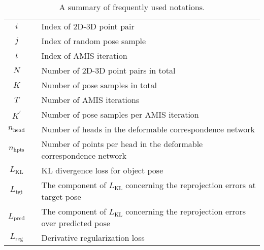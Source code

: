 \documentclass[10pt,twocolumn,letterpaper]{article}
\begin{document}
\begin{table*}[b]
\begin{center}
{\begin{tabular}{cll}
        $i$ & & Index of 2D-3D point pair\\
        $j$ & & Index of random pose sample\\
        $t$ & & Index of AMIS iteration\\
        $N$ & & Number of 2D-3D point pairs in total\\
        $K$ & & Number of pose samples in total\\
        $T$ & & Number of AMIS iterations\\
        $K^\prime$ & & Number of pose samples per AMIS iteration\\
        $n_\text{head}$ & & Number of heads in the deformable correspondence network\\
        $n_\text{hpts}$ & & Number of points per head in the deformable correspondence network\\
        $L_\text{KL}$ & & KL divergence loss for object pose\\
        $L_\text{tgt}$ & & The component of $L_\text{KL}$ concerning the reprojection errors at target pose\\
        $L_\text{pred}$ & & The component of $L_\text{KL}$ concerning the reprojection errors over predicted pose\\
        $L_\text{reg}$ & & Derivative regularization loss\\
\bottomrule
    \end{tabular}}
    \end{center}
    \vspace{-1ex}
    \caption{A summary of frequently used notations.} 
    \vspace*{2.2cm}
    \label{tab:notation}
\end{table*}

\clearpage
\end{document}
